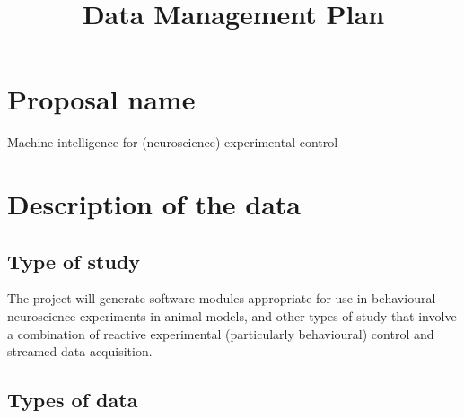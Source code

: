 \documentclass[a4paper,11pt]{article}
\title{Data Management Plan}
\author{}
\date{}
\begin{document}
\maketitle


\setcounter{section}{-1}

\section{Proposal name}


Machine intelligence for (neuroscience) experimental control

\section{Description of the data}
\subsection{Type of study}


The project will generate software modules appropriate for use in behavioural neuroscience experiments in animal models, and other types of study that involve a combination of reactive experimental (particularly behavioural) control and streamed data acquisition.  


\subsection{Types of data}
\end{document}
